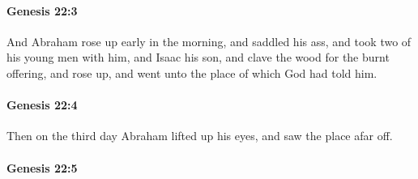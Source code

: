 
		\paragraph{Genesis 22:3} %
			\label{GENESIS-22-3}

			And Abraham rose up early in the morning, and saddled his ass, and took two of his young men with him, and Isaac his son, and clave the wood for the burnt offering, and rose up, and went unto the place of which God had told him.


		\paragraph{Genesis 22:4} %
			\label{GENESIS-22-4}

			Then on the third day Abraham lifted up his eyes, and saw the place afar off.


		\paragraph{Genesis 22:5} %
			\label{GENESIS-22-5}

